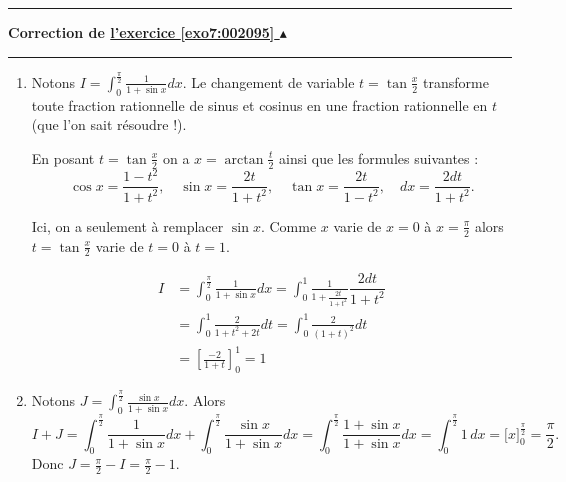 \documentclass[11pt,a4paper]{article}
\newcounter{exo}
\newcommand{\correction}[1]{\hypertarget{cor7:#1}{}\label{cor7:#1}{\bf Correction de \hyperlink{exo7:#1}{l'exercice \ref{exo7:#1} $\blacktriangle$}}\vspace{1mm}\hrule\vspace{1mm}}
\newcommand{\fincorrection}{\vspace{1mm}\hrule\vspace*{7mm}}
\begin{document}
\fincorrection
\correction{002095}
\begin{enumerate}
  \item Notons $I = \int_0^{\frac \pi 2}\frac 1{1+\sin x} dx$.
Le changement de variable $t = \tan \frac x2$ transforme toute fraction rationnelle 
de sinus et cosinus en une fraction rationnelle en $t$ (que l'on sait résoudre !).

En posant $t=\tan \frac{x}{2}$ on a $x=\arctan \frac t2$ ainsi que les formules suivantes : 
$$\cos x = \frac {1-t^2}{1+t^2}, \quad \sin x = \frac{2t}{1+t^2}, 
\quad \tan x = \frac{2t}{1-t^2}, \quad dx=\dfrac{2dt}{1+t^2}.$$

Ici, on a seulement à remplacer $\sin x$.
Comme $x$ varie de $x=0$ à $x=\frac\pi 2$ alors $t=\tan \frac{x}{2}$ varie de $t=0$ à $t=1$.

\begin{align*}  
  I &= \int_0^{\frac \pi 2}\frac 1{1+\sin x} dx 
     = \int_0^1  \frac 1 {1+ \frac{2t}{1+t^2}}  \dfrac{2dt}{1+t^2} \\ 
    &= \int_0^1 \frac{2}{1+t^2 + 2t} dt 
    = \int_0^1 \frac{2}{(1+t)^2} dt \\
    &= \left[ \frac{-2}{1+t} \right]_0^1 
    = 1
\end{align*}

  \item Notons $J = \int_0^{\frac \pi 2}\frac{\sin x}{1+\sin x} dx$.
Alors 
$$I+J =  \int_0^{\frac \pi 2}\frac 1{1+\sin x} dx + \int_0^{\frac \pi 2}\frac{\sin x}{1+\sin x} dx
= \int_0^{\frac \pi 2} \frac{1+\sin x}{1+\sin x} dx = \int_0^{\frac \pi 2} 1 \, dx = \big[ x \big]_0^{\frac \pi 2} = \frac \pi 2.$$
Donc $J = \frac \pi 2 - I= \frac \pi 2 - 1$.
\end{enumerate}
\end{document}
